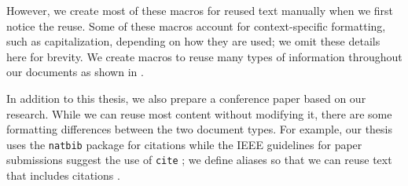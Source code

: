 \begin{landscape}
    
\end{landscape}

However, we create most of these macros for reused text manually when we first
notice the reuse. Some of these macros account for context-specific formatting,
such as capitalization, depending on how they are used; we omit these details
here for brevity. We create macros to reuse many types of information
throughout our documents as shown in .



\label{paper-macros}
In addition to this thesis, we also prepare a conference paper based on our
research. While we can reuse most content without modifying it, there are some
formatting differences between the two document types. For example, our thesis
uses the \texttt{natbib} package for citations while the IEEE guidelines for
paper submissions suggest the use of \texttt{cite} \citep[p.~8]{Shell2015};
we define aliases so that we can reuse text that includes citations
.

